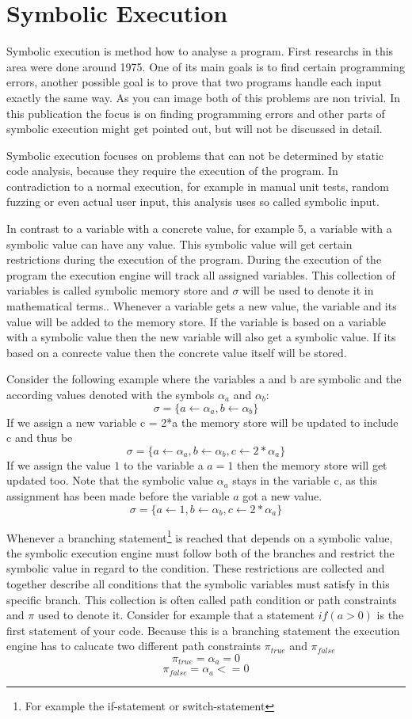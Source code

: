 \section{Symbolic Execution}
Symbolic execution is method how to analyse a program. First researchs in this area were done around 1975. One of its main goals is to find certain programming errors, another possible goal is to prove that two programs handle each input exactly the same way. As you can image both of this problems are non trivial. In this publication the focus is on finding programming errors and other parts of symbolic execution might get pointed out, but will not be discussed in detail. 

Symbolic execution focuses on problems that can not be determined by static code analysis, because they require the execution of the program. In contradiction to a normal execution, for example in manual unit tests, random fuzzing or even actual user input, this analysis uses so called symbolic input.

In contrast to a variable with a concrete value, for example 5, a variable with a symbolic value can have any value. This symbolic value will get certain restrictions during the execution of the program. During the execution of the program the execution engine will track all assigned variables. This collection of variables is called symbolic memory store and $\sigma$ will be used to denote it in mathematical terms.\cite{SurveySymExec-CSUR18}.
Whenever a variable gets a new value, the variable and its value will be added to the memory store. If the variable is based on a variable with a symbolic value then the new variable will also get a symbolic value. If its based on a conrecte value then the concrete value itself will be stored.

Consider the following example where the variables a and b are symbolic and the according values denoted with the symbols $\alpha_a$ and $\alpha_b$:
$$\sigma = \{a\gets \alpha_a , b \gets \alpha_b\}$$
If we assign a new variable c = 2*a the memory store will be updated to include c and thus be
$$\sigma = \{a\gets \alpha_a , b \gets \alpha_b, c \gets 2*\alpha_a\}$$
If we assign the value $1$ to the variable a $a = 1$ then the memory store will get updated too. Note that the symbolic value $\alpha_a$ stays in the variable c, as this assignment has been made before the variable $a$ got a new value.
$$\sigma = \{a\gets 1, b \gets \alpha_b, c \gets 2*\alpha_a\}$$


Whenever a branching statement\footnote{For example the if-statement or switch-statement} is reached that depends on a symbolic value, the symbolic execution engine must follow both of the branches and restrict the symbolic value in regard to the condition. These restrictions are collected and together describe all conditions that the symbolic variables must satisfy in this specific branch. This collection is often called path condition or path constraints and $\pi$ used to denote it\cite{SurveySymExec-CSUR18}.
Consider for example that a statement $if (a > 0)$ is the first statement of your code. Because this is a branching statement the execution engine has to calucate two different path constraints $\pi_{true}$ and $\pi_{false}$
$$\pi_{true} = \alpha_a = 0$$
$$\pi_{false} = \alpha_a <= 0$$

